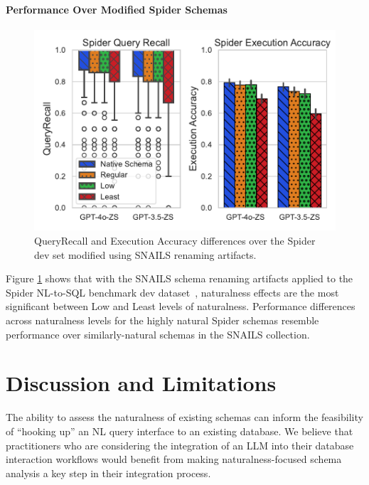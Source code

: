 \paragraph{\textbf{Performance Over Modified Spider Schemas}}

\begin{figure}
  \centering
  \includegraphics[width=\figwidthmod\linewidth]{figures/spider-combined-results.pdf}
  \caption{QueryRecall and Execution Accuracy differences over the Spider~\cite{Yu&al.18c} dev set modified using SNAILS renaming artifacts.}
  \label{fig:spiderresults}
\end{figure}

Figure \ref{fig:spiderresults} shows that with the SNAILS schema renaming artifacts applied to the Spider NL-to-SQL benchmark dev dataset~\cite{Yu&al.18c}, naturalness effects are the most significant between Low and Least levels of naturalness.
Performance differences across naturalness levels for the highly natural Spider schemas resemble performance over similarly-natural schemas in the SNAILS collection.



\section{Discussion and Limitations}


The ability to assess the naturalness of existing schemas can inform the feasibility of ``hooking up'' an NL query interface to an existing database.
We believe that practitioners who are considering the integration of an LLM into their database interaction workflows would benefit from making naturalness-focused schema analysis a key step in their integration process.

